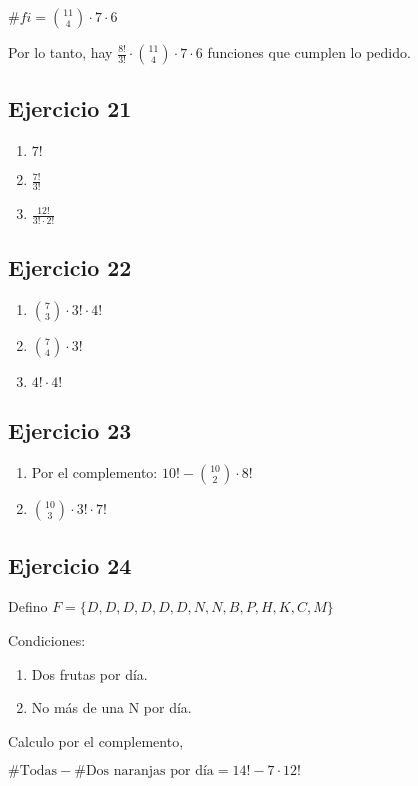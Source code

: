 $\#fi = \binom{11}{4} \cdot 7 \cdot 6$

Por lo tanto, hay $ \frac{8!}{3!} \cdot \binom{11}{4} \cdot 7 \cdot 6 $ funciones que cumplen lo pedido.

\subsection{Ejercicio 21}
\begin{enumerate}
    \item $ 7! $
    \item $ \frac{7!}{3!} $
    \item $ \frac{12!}{3!\cdot 2!} $
\end{enumerate}

\subsection{Ejercicio 22}
\begin{enumerate}
    \item $ \binom{7}{3} \cdot 3! \cdot 4! $
    \item $ \binom{7}{4} \cdot 3! $
    \item $ 4! \cdot 4! $
\end{enumerate}

\subsection{Ejercicio 23}
\begin{enumerate}
    \item Por el complemento: $ 10! - \binom{10}{2} \cdot 8!$
    \item $ \binom{10}{3} \cdot 3! \cdot 7!$
\end{enumerate}

\subsection{Ejercicio 24}
Defino $ F = \{ D,D,D,D,D,D,N,N,B,P,H,K,C,M \} $

Condiciones:
\begin{enumerate}
    \item Dos frutas por día.
    \item No más de una N por día.
\end{enumerate}

Calculo por el complemento,

$ \# \text{Todas} - \# \text{Dos naranjas por día} = 14! - 7 \cdot 12!$

